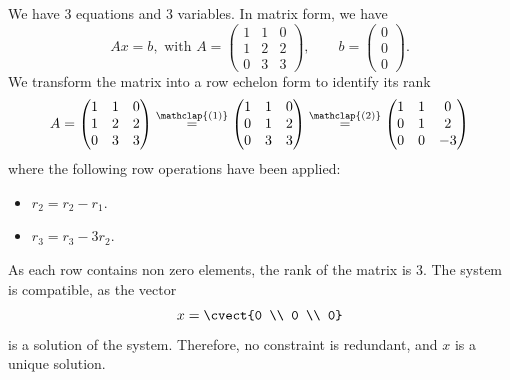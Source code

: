 We have 3 equations and 3 variables. In matrix form, we have
\[
Ax = b, \text{ with } A= \begin{pmatrix}
1&1&0\\ 1&2&2\\ 0&3&3
\end{pmatrix}, \qquad b = \begin{pmatrix}
0\\0\\0
\end{pmatrix}.
\]
We transform the matrix into a row echelon form to identify its rank
\[
A=
\begin{pmatrix}
  1 & 1 & 0 \\ 1  & 2 & 2 \\ 0  & 3 & 3  
\end{pmatrix}
\stackrel{\mathclap{(1)}}{=}
\begin{pmatrix}
  1 & 1 & 0 \\ 0 & 1 & 2  \\ 0 & 3 & 3
\end{pmatrix}
\stackrel{\mathclap{(2)}}{=}
\begin{pmatrix}
  1 & 1  & 0 \\ 0 & 1 & 2  \\ 0 & 0 & -3
\end{pmatrix}
\]
where the following row operations have been applied:
\begin{itemize}
\item[(1)] $r_2=r_2-r_1$.
\item[(2)] $r_3 = r_3 -3 r_2$.
\end{itemize}
As each row contains non
zero elements, the rank of the matrix is 3. 
The system is compatible, as the vector
\[
x=\cvect{0 \\ 0 \\ 0}
\]
is a solution of the system. Therefore, no constraint is
redundant, and $x$ is a unique solution. 
